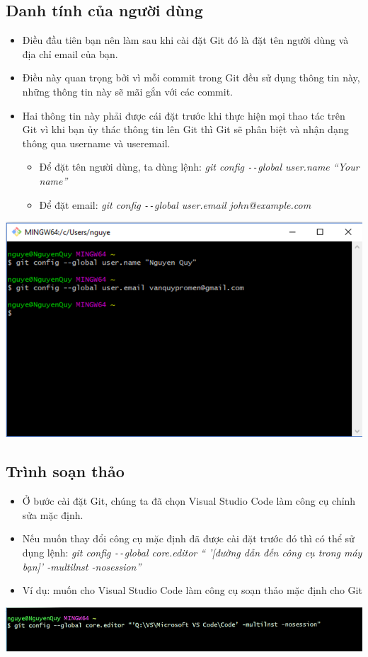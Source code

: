 \documentclass[12pt,a4paper]{report}
\begin{document}
\subsection{Danh tính của người dùng}
\begin{itemize}
\item Điều đầu tiên bạn nên làm sau khi cài đặt Git đó là đặt tên người dùng và địa chỉ email của bạn.
\item Điều này quan trọng bởi vì mỗi commit trong Git đều sử dụng thông tin này, những thông tin này sẽ mãi gắn với các commit.
\item Hai thông tin này phải được cái đặt trước khi thực hiện mọi thao tác trên Git vì khi bạn ủy thác thông tin lên Git thì Git sẽ phân biệt và nhận dạng thông qua username và useremail.
	\begin{itemize}
		\item Để đặt tên người dùng, ta dùng lệnh: {\it  git config \texttt{-{}-}global user.name “Your name”}
		\item Để đặt email: {\it git config \texttt{-{}-}global user.email john@example.com}
	\end{itemize}
\end{itemize}
	\includegraphics[width=0.8\linewidth]{screenshot001}
	\label{fig:screenshot001}
\vskip 0.4cm
\vskip 0.4cm
\subsection{Trình soạn thảo}
\begin{itemize}
\item Ở bước cài đặt Git, chúng ta đã chọn Visual Studio Code làm công cụ chỉnh sửa mặc định.
\item Nếu muốn thay đổi công cụ mặc định đã được cài đặt trước đó thì có thể sử dụng lệnh:
{\it git config \texttt{-{}-}global core.editor “ ’[đường dẫn đến công cụ trong máy bạn]’ -multilnst -nosession”}
\item Ví dụ: muốn cho Visual Studio Code làm công cụ soạn thảo mặc định cho Git
\end{itemize}
\vskip 0.4cm
\vskip 0.4cm
	\includegraphics[width=0.8\linewidth]{screenshot002}
	\label{fig:screenshot002}
\vskip 0.4cm \vskip 0.4cm
\end{document}

